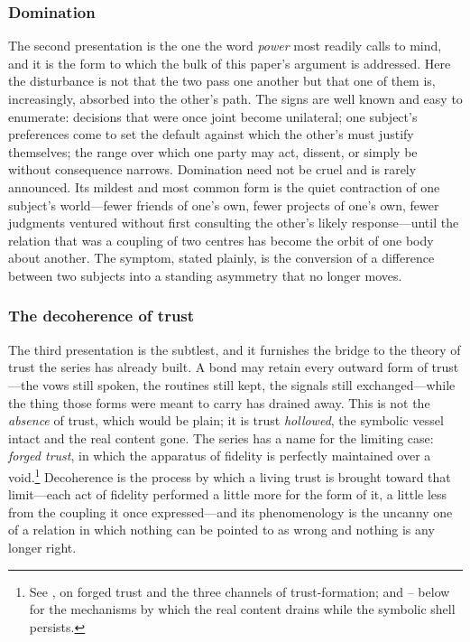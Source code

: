\subsubsection{Domination}

The second presentation is the one the word \emph{power} most readily calls to mind, and it is the form to which the bulk of this paper's argument is addressed. Here the disturbance is not that the two pass one another but that one of them is, increasingly, absorbed into the other's path. The signs are well known and easy to enumerate: decisions that were once joint become unilateral; one subject's preferences come to set the default against which the other's must justify themselves; the range over which one party may act, dissent, or simply be without consequence narrows. Domination need not be cruel and is rarely announced. Its mildest and most common form is the quiet contraction of one subject's world---fewer friends of one's own, fewer projects of one's own, fewer judgments ventured without first consulting the other's likely response---until the relation that was a coupling of two centres has become the orbit of one body about another. The symptom, stated plainly, is the conversion of a difference between two subjects into a standing asymmetry that no longer moves.

\subsubsection{The decoherence of trust}

The third presentation is the subtlest, and it furnishes the bridge to the theory of trust the series has already built. A bond may retain every outward form of trust---the vows still spoken, the routines still kept, the signals still exchanged---while the thing those forms were meant to carry has drained away. This is not the \emph{absence} of trust, which would be plain; it is trust \emph{hollowed}, the symbolic vessel intact and the real content gone. The series has a name for the limiting case: \emph{forged trust}, in which the apparatus of fidelity is perfectly maintained over a void.\footnote{See \textcite{paperxiii}, on forged trust and the three channels of trust-formation; and -- below for the mechanisms by which the real content drains while the symbolic shell persists.} Decoherence is the process by which a living trust is brought toward that limit---each act of fidelity performed a little more for the form of it, a little less from the coupling it once expressed---and its phenomenology is the uncanny one of a relation in which nothing can be pointed to as wrong and nothing is any longer right.

